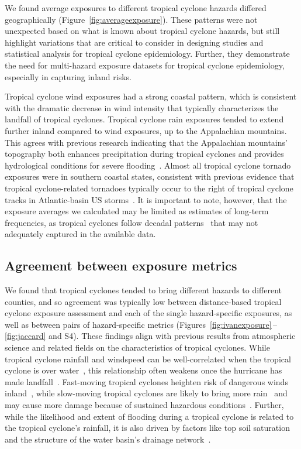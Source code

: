 We found average exposures to different tropical cyclone hazards differed
geographically (Figure~\ref{fig:averageexposure}). These patterns were not
unexpected based on what is known about tropical cyclone hazards, but still
highlight variations that are critical to consider in designing studies and
statistical analysis for tropical cyclone epidemiology. Further, they
demonstrate the need for multi-hazard exposure datasets for tropical cyclone
epidemiology, especially in capturing inland risks. 

Tropical cyclone wind exposures had a strong coastal pattern, which is
consistent with the dramatic decrease in wind intensity that typically
characterizes the landfall of tropical cyclones.  Tropical cyclone rain
exposures tended to extend further inland compared to wind exposures, up to
the Appalachian mountains. This agrees with previous research indicating that
the Appalachian mountains' topography both enhances precipitation during
tropical cyclones and provides hydrological conditions for severe
flooding~\parencite{rees2001}.  Almost all tropical cyclone tornado exposures
were in southern coastal states, consistent with previous evidence that
tropical cyclone-related tornadoes typically occur to the right of tropical
cyclone tracks in Atlantic-basin \ac{US} storms~\parencite{moore2012}.  It is
important to note, however, that the exposure averages we calculated may be
limited as estimates of long-term frequencies, as tropical cyclones follow
decadal patterns~\parencite{kossin2007more} that may not adequately captured in
the available data. 

\subsection*{Agreement between exposure metrics}

We found that tropical cyclones tended to bring different hazards to different
counties, and so agreement was typically low between distance-based
tropical cyclone exposure assessment and each of the single hazard-specific
exposures, as well as between pairs of hazard-specific metrics
(Figures~\ref{fig:ivanexposure}\,--\,\ref{fig:jaccard} and S4).  These
findings align with previous results from atmospheric science and related
fields on the characteristics of tropical cyclones. While tropical cyclone
rainfall and windspeed can be well-correlated when the tropical cyclone is over
water~\parencite{cerveny2000}, this relationship often weakens once the
hurricane has made landfall~\parencite{jiang2008}.  Fast-moving tropical
cyclones heighten risk of dangerous winds inland~\parencite{kruk2010},
while slow-moving tropical cyclones are likely to bring more
rain~\parencite{rappaport2000} and may cause more damage because of sustained
hazardous conditions~\parencite{rezapour2014}. Further, while the likelihood
and extent of flooding during a tropical cyclone is related to the tropical
cyclone's rainfall, it is also driven by factors like top soil saturation and
the structure of the water basin's drainage network~\parencite{chen2015,
rees2001}. 

